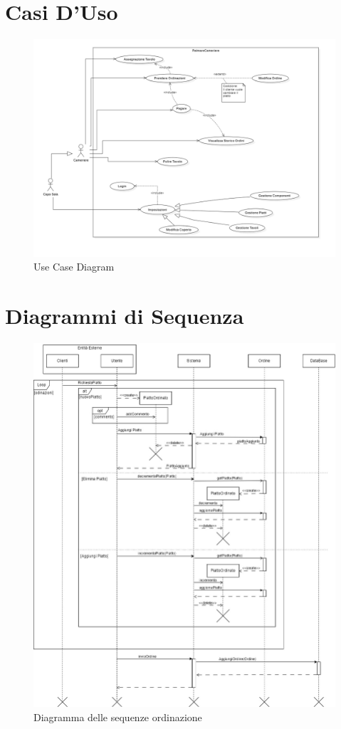 \documentclass[12pt, letterpaper]{book}
\begin{document}
\section{Casi D'Uso}
\begin{figure}[H]
    \centering
    \includegraphics[width = 1 \linewidth]{../UML/Diagrammi/Use_Case_Diagram.png}
    \caption{Use Case Diagram}
    \label{fig: useCase}
\end{figure}

\newpage

\section{Diagrammi di Sequenza}
\begin{figure}[H]
    \centering
    \includegraphics[width =0.9 \linewidth]{../UML/DrawIo/Sequence/Diagramme delle Sequenze-Ordinazione.jpg}
    \caption{Diagramma delle sequenze ordinazione}
    \label{UM: S-ordinazione}
\end{figure}
\end{document}
